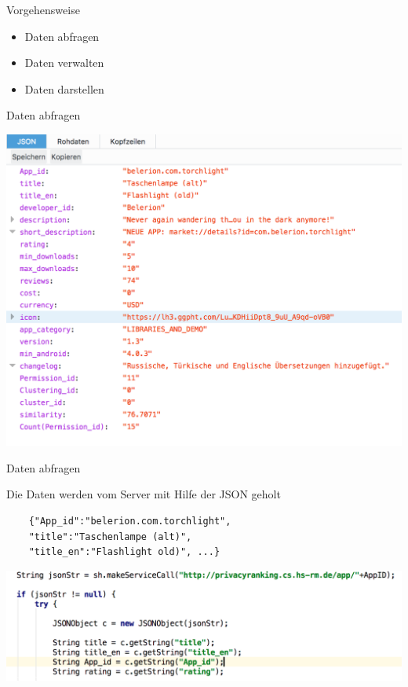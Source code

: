 \documentclass[compress,t]{beamer}
\begin{document}
\begin{frame}[fragile]{Vorgehensweise}


    \begin{itemize}
        \item Daten abfragen
        \item Daten verwalten
        \item Daten darstellen 
    \end{itemize}

\end{frame}

\begin{frame}[fragile]{Daten abfragen}

	\begin{center}
    	\includegraphics[width=1.0\textwidth]{img/json.png}
	 \end{center}
    
\end{frame}

\begin{frame}[fragile]{Daten abfragen}

    Die Daten werden vom Server mit Hilfe der JSON geholt
    \begin{lstlisting}
    {"App_id":"belerion.com.torchlight",
    "title":"Taschenlampe (alt)",
    "title_en":"Flashlight old)", ...}
    \end{lstlisting}

    \begin{center}
        \includegraphics[width=1.0\textwidth]{img/json_bs.png}

    \end{center}

\end{frame}
\end{document}
